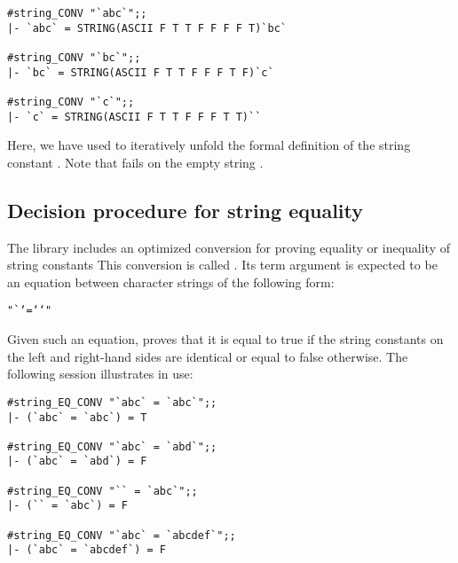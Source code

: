 \begin{session}\begin{verbatim}
#string_CONV "`abc`";;
|- `abc` = STRING(ASCII F T T F F F F T)`bc`

#string_CONV "`bc`";;
|- `bc` = STRING(ASCII F T T F F F T F)`c`

#string_CONV "`c`";;
|- `c` = STRING(ASCII F T T F F F T T)``
\end{verbatim}\end{session}

\noindent Here, we have used  to iteratively unfold the formal
definition of the string constant .  Note that 
fails on the empty string .


\subsection{Decision procedure for string equality}\label{string-eq-conv}%

The  library includes an optimized conversion for proving equality
or inequality of string constants This conversion is called
. Its term argument is expected to be an equation between
character strings of the following form:

\begin{hol}\begin{alltt}
   "`\m{\ldots}` = `\m{\ldots}`"
\end{alltt}\end{hol}

\noindent Given such an equation,  proves that it is equal
to true if the string constants on the left and right-hand sides are identical
or equal to false otherwise.  The following session illustrates
 in use:

\begin{session}\begin{verbatim}
#string_EQ_CONV "`abc` = `abc`";;
|- (`abc` = `abc`) = T

#string_EQ_CONV "`abc` = `abd`";;
|- (`abc` = `abd`) = F

#string_EQ_CONV "`` = `abc`";;
|- (`` = `abc`) = F

#string_EQ_CONV "`abc` = `abcdef`";;
|- (`abc` = `abcdef`) = F
\end{verbatim}\end{session}

